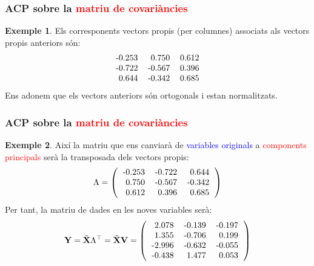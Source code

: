 \documentclass[12pt,t]{beamer}
\newcommand{\red}[1]{\textcolor{red}{#1}}
\newcommand{\blue}[1]{\textcolor{blue}{#1}}
\theoremstyle{plain}
\theoremstyle{definition}
\newtheorem{exemple}{Exemple}
\begin{document}
\begin{frame}
\frametitle{ACP sobre la \red{matriu de covariàncies}}
\begin{exemple}
Els corresponents vectors propis (per columnes) associats als vectors propis anteriors són:
\[
\begin{tabular}{rrr}
  -0.253 & 0.750 & 0.612 \\ 
  -0.722 & -0.567 & 0.396 \\ 
  0.644 & -0.342 & 0.685 \\ 
  \end{tabular}\]
Ens adonem que els vectors anteriors són ortogonals i estan normalitzats.


\end{exemple}
\end{frame}

\begin{frame}
\frametitle{ACP sobre la \red{matriu de covariàncies}}
\begin{exemple}
{\small
Així la matriu que ens canviarà de \blue{variables originals} a \red{components principals} serà la transposada dels 
vectors propis:
\[
\Lambda=
\left(
\begin{tabular}{rrr}
  -0.253 & -0.722 & 0.644 \\ 
  0.750 & -0.567 & -0.342 \\ 
  0.612 & 0.396 & 0.685 \\ 
  \end{tabular}\right)
\]
Per tant, la matriu de dades en les noves variables serà:
\[
\mathbf{Y}=\tilde{\mathbf{X}}\Lambda^\top = \tilde{\mathbf{X}}\mathbf{V}=
\left(
\begin{tabular}{rrr}
  2.078 & -0.139 & -0.197 \\ 
  1.355 & -0.706 & 0.199 \\ 
  -2.996 & -0.632 & -0.055 \\ 
  -0.438 & 1.477 & 0.053 \\ 
  \end{tabular}\right)
\]
}
\end{exemple}
\end{frame}
\end{document}
